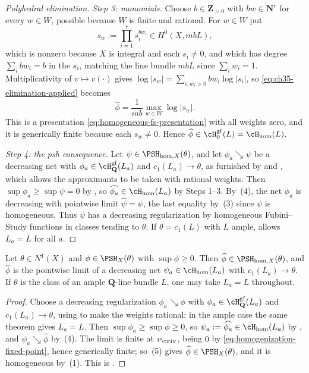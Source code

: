 \begin{proof}[Polyhedral elimination]
\emph{Step 3: monomials.}  Choose $b\in\mathbf Z_{>0}$ with
$bw\in\mathbf N^r$ for every $w\in W$, possible because $W$ is finite
and rational.  For $w\in W$ put
\[
 s_w:=\prod_{i=1}^rs_i^{bw_i}\in H^0(X,mbL),
\]
which is nonzero because $X$ is integral and each $s_i\neq0$, and which
has degree $\sum_ibw_i=b$ in the $s_i$, matching the line bundle
$mbL$ since $\sum_iw_i=1$.  Multiplicativity of $v\mapsto v(\cdot)$
gives $\log|s_w|=\sum_{i:w_i>0}bw_i\log|s_i|$, so
\eqref{eq:ch35-elimination-applied} becomes
\[
 \widehat\phi=\frac1{mb}\max_{w\in W}\log|s_w| .
\]
This is a presentation \eqref{eq:homogeneous-fs-presentation} with all
weights zero, and it is generically finite because each $s_w\neq0$.
Hence $\widehat\phi\in\cH^{\mathrm{gf}}_0(L)=\cH_{\mathrm{hom}}(L)$.

\emph{Step 4: the psh consequence.}  Let
$\psi\in\PSH_{\mathrm{hom},X}(\theta)$, and let
$\phi_a\searrow\psi$ be a decreasing net with
$\phi_a\in\cH^{\mathrm{gf}}_{\mathbf Q}(L_a)$ and
$c_1(L_a)\to\theta$, as furnished by  and
\cite[Theorem~4.15]{BJ22}, which allows the approximants to be taken with
rational weights.  Then $\sup\phi_a\geq\sup\psi=0$ by
, so
$\widehat{\phi_a}\in\cH_{\mathrm{hom}}(L_a)$ by Steps 1--3.  By
\,(4), the net
$\widehat{\phi_a}$ is decreasing with pointwise limit
$\widehat\psi=\psi$, the last equality by
\,(3) since $\psi$ is homogeneous.
Thus $\psi$ has a decreasing regularization by homogeneous Fubini--Study
functions in classes tending to $\theta$.  If $\theta=c_1(L)$ with
$L$ ample, \cite[Theorem~4.15\,(iii)]{BJ22} allows $L_a=L$ for all
$a$.
\end{proof}

\begin{corollary}
\label{cor:ch35-homogenization-psh}
Let $\theta\in N^1(X)$ and $\phi\in\PSH_X(\theta)$ with
$\sup\phi\geq0$.  Then
$\widehat\phi\in\PSH_{\mathrm{hom},X}(\theta)$, and $\widehat\phi$ is
the pointwise limit of a decreasing net $\psi_a\in\cH_{\mathrm{hom}}(L_a)$
with $c_1(L_a)\to\theta$.  If $\theta$ is the class of an ample
$\mathbf Q$-line bundle $L$, one may take $L_a=L$ throughout.
\end{corollary}

\begin{proof}
Choose a decreasing regularization $\phi_a\searrow\phi$ with
$\phi_a\in\cH^{\mathrm{gf}}_{\mathbf Q}(L_a)$ and
$c_1(L_a)\to\theta$, using \cite[Theorem~4.15]{BJ22} to make the weights
rational; in the ample case the same theorem gives $L_a=L$.  Then
$\sup\phi_a\geq\sup\phi\geq0$, so
$\psi_a:=\widehat{\phi_a}\in\cH_{\mathrm{hom}}(L_a)$ by
, and $\psi_a\searrow\widehat\phi$ by
\,(4).  The limit is finite at
$v_{\triv}$, being $0$ by
\eqref{eq:homogenization-fixed-point}, hence generically finite; so
\,(5) gives
$\widehat\phi\in\PSH_X(\theta)$, and it is homogeneous by
\,(1).  This is
\cite[Corollary~6.17]{BJ22}.
\end{proof}


